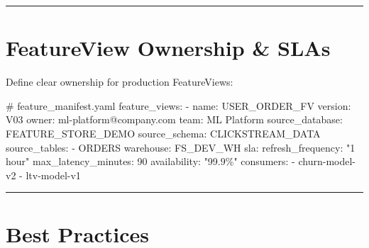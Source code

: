 \documentclass[
  letterpaper,
  DIV=11,
  numbers=noendperiod]{scrreprt}
\newenvironment{Shaded}{\begin{snugshade}}{\end{snugshade}}
\newcommand{\AttributeTok}[1]{\textcolor[rgb]{0.40,0.45,0.13}{#1}}
\newcommand{\CommentTok}[1]{\textcolor[rgb]{0.37,0.37,0.37}{#1}}
\newcommand{\DecValTok}[1]{\textcolor[rgb]{0.68,0.00,0.00}{#1}}
\newcommand{\FunctionTok}[1]{\textcolor[rgb]{0.28,0.35,0.67}{#1}}
\newcommand{\KeywordTok}[1]{\textcolor[rgb]{0.00,0.23,0.31}{#1}}
\newcommand{\StringTok}[1]{\textcolor[rgb]{0.13,0.47,0.30}{#1}}
\begin{document}
\begin{center}\rule{0.5\linewidth}{0.5pt}\end{center}

\hypertarget{featureview-ownership-slas}{%
\section{FeatureView Ownership \&
SLAs}\label{featureview-ownership-slas}}

Define clear ownership for production FeatureViews:

\begin{Shaded}
\begin{Highlighting}[]
\CommentTok{\# feature\_manifest.yaml}
\FunctionTok{feature\_views}\KeywordTok{:}
\AttributeTok{  }\KeywordTok{{-}}\AttributeTok{ }\FunctionTok{name}\KeywordTok{:}\AttributeTok{ USER\_ORDER\_FV}
\AttributeTok{    }\FunctionTok{version}\KeywordTok{:}\AttributeTok{ V03}
\AttributeTok{    }\FunctionTok{owner}\KeywordTok{:}\AttributeTok{ ml{-}platform@company.com}
\AttributeTok{    }\FunctionTok{team}\KeywordTok{:}\AttributeTok{ ML Platform}
\AttributeTok{    }\FunctionTok{source\_database}\KeywordTok{:}\AttributeTok{ FEATURE\_STORE\_DEMO}
\AttributeTok{    }\FunctionTok{source\_schema}\KeywordTok{:}\AttributeTok{ CLICKSTREAM\_DATA}
\AttributeTok{    }\FunctionTok{source\_tables}\KeywordTok{:}
\AttributeTok{      }\KeywordTok{{-}}\AttributeTok{ ORDERS}
\AttributeTok{    }\FunctionTok{warehouse}\KeywordTok{:}\AttributeTok{ FS\_DEV\_WH}
\AttributeTok{    }\FunctionTok{sla}\KeywordTok{:}
\AttributeTok{      }\FunctionTok{refresh\_frequency}\KeywordTok{:}\AttributeTok{ }\StringTok{"1 hour"}
\AttributeTok{      }\FunctionTok{max\_latency\_minutes}\KeywordTok{:}\AttributeTok{ }\DecValTok{90}
\AttributeTok{      }\FunctionTok{availability}\KeywordTok{:}\AttributeTok{ }\StringTok{"99.9\%"}
\AttributeTok{    }\FunctionTok{consumers}\KeywordTok{:}
\AttributeTok{      }\KeywordTok{{-}}\AttributeTok{ churn{-}model{-}v2}
\AttributeTok{      }\KeywordTok{{-}}\AttributeTok{ ltv{-}model{-}v1}
\end{Highlighting}
\end{Shaded}

\begin{center}\rule{0.5\linewidth}{0.5pt}\end{center}

\hypertarget{best-practices-2}{%
\section{Best Practices}\label{best-practices-2}}
\end{document}
